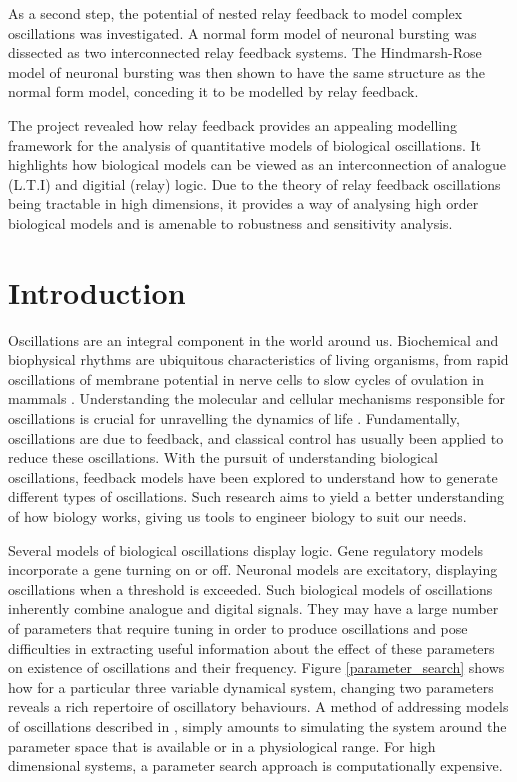 \documentclass[a4paper, 12pt]{article}
\begin{document}
As a second step, the potential of nested relay feedback to model complex oscillations was investigated. A normal form model of neuronal bursting was dissected as two interconnected relay feedback systems. The Hindmarsh-Rose model of neuronal bursting was then shown to have the same structure as the normal form model, conceding it to be modelled by relay feedback. 

The project revealed how relay feedback provides an appealing modelling framework for the analysis of quantitative models of biological oscillations. It highlights how biological models can be viewed as an interconnection of analogue (L.T.I) and digitial (relay) logic. Due to the theory of relay feedback oscillations being tractable in high dimensions, it provides a way of analysing high order biological models and is amenable to robustness and sensitivity analysis. 

\newpage
\tableofcontents
\newpage
\section{Introduction}
Oscillations are an integral component in the world around us. Biochemical and biophysical rhythms are ubiquitous characteristics of living organisms, from rapid oscillations of membrane potential in nerve cells to slow cycles of ovulation in mammals \cite{fall}. Understanding the molecular and cellular mechanisms responsible for oscillations is crucial for unravelling the dynamics of life \cite{goldbeter1}. Fundamentally, oscillations are due to feedback, and classical control has usually been applied to reduce these oscillations. With the pursuit of understanding biological oscillations, feedback models have been explored to understand how to generate different types of oscillations. Such research aims to yield a better understanding of how biology works, giving us tools to engineer biology to suit our needs. 

Several models of biological oscillations display logic. Gene regulatory models incorporate a gene turning on or off. Neuronal models are excitatory, displaying oscillations when a threshold is exceeded. Such biological models of oscillations inherently combine analogue and digital signals. They may have a large number of parameters that require tuning in order to produce oscillations and pose difficulties in extracting useful information about the effect of these parameters on existence of oscillations and their frequency. Figure \ref{parameter_search} shows how for a particular three variable dynamical system, changing two parameters reveals a rich repertoire of oscillatory behaviours. A method of addressing models of oscillations described in \cite{goldbeter1}, simply amounts to simulating the system around the parameter space that is available or in a physiological range. For high dimensional systems, a parameter search approach is computationally expensive. 
\end{document}
